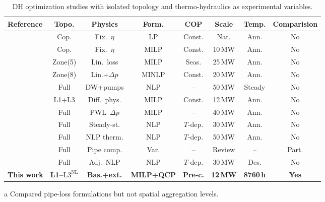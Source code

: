 \documentclass[a4paper,fleqn]{cas-dc}
\newcommand{\Lnl}{\mathrm{L3}^{\mathrm{NL}}}
\begin{document}
\begin{table}[!tbp]
\centering
\caption{DH optimization studies with
isolated topology and thermo-hydraulics as experimental
variables.}
\label{tab:prior_work}
\begin{threeparttable}
\footnotesize
\setlength{\tabcolsep}{4pt}
\begin{tabular}{@{}l c c c c c c c@{}}
\toprule
Reference & Topo. & Physics & Form. & COP &
  Scale & Temp. & Comparision \\
\midrule
\citet{Connolly2014_EnergyPLAN}
  & Cop. & Fix.~$\eta$ & LP & Const. & Nat. & Ann. & No \\
\citet{Gabrielli2018}
  & Cop. & Fix.~$\eta$ & MILP & Const. & 10\,MW & Ann. & No \\
\citet{Wirtz2020}
  & Zone(5) & Lin.\ loss & MILP & Seas. & 25\,MW & Ann. & No \\
\citet{Mertz2016}
  & Zone(8) & Lin.+$\Delta p$ & MINLP & Const.
  & 20\,MW & Ann. & No \\
\citet{Hari2024}
  & Full & DW+pumps & NLP & -- & 50\,MW & Steady & No \\
\citet{Leitner2019}
  & L1+L3 & Diff.\ phys. & MILP & Const. & 12\,MW
  & Ann. & No \\
\citet{Bordin2016}
  & Full & PWL~$\Delta p$ & MILP & -- & 40\,MW & Ann. & No \\
\citet{Giraud2015}
  & Full & Steady-st. & NLP & $T$-dep. & 30\,MW & Ann. & No \\
\citet{Vesterlund2017}
  & Full & NLP therm. & NLP & $T$-dep. & 50\,MW & Ann. & No \\
\citet{vanderHeijde2017}
  & Full & Pipe comp. & Var. & -- & Review & --
  & Part.\tnote{a} \\
\citet{Blommaert2020}
  & Full & Adj.\ NLP & NLP & $T$-dep. & 30\,MW & Des. & No \\
\midrule
\textbf{This work}
  & \textbf{L1--$\Lnl$}
  & \textbf{Bas.+ext.}
  & \textbf{MILP+QCP}
  & \textbf{Pre-c.}
  & \textbf{12\,MW}
  & \textbf{8760\,h}
  & \textbf{Yes} \\
\bottomrule
\end{tabular}
\begin{tablenotes}\footnotesize
  \item[a] Compared pipe-loss formulations but not spatial
    aggregation levels.
\end{tablenotes}
\end{threeparttable}
\end{table}

\end{document}
